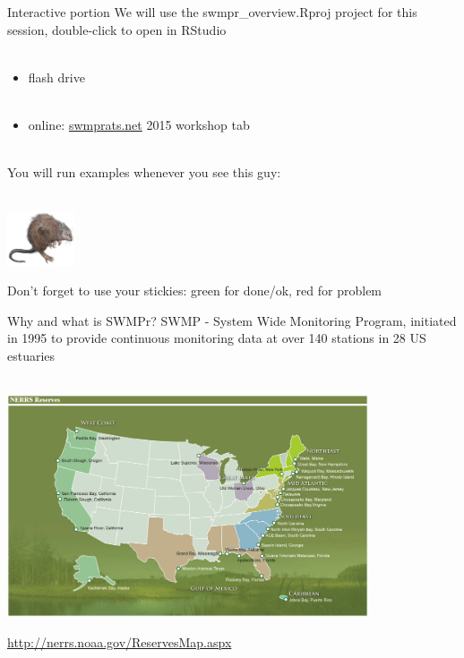 \documentclass[xcolor=dvipsnames,serif]{beamer}\usepackage[]{graphicx}\usepackage[]{color}
\begin{document}
\begin{frame}{Interactive portion}
\onslide<+->
We will use the swmpr\_overview.Rproj project for this session, double-click to open in RStudio \\~\\
\begin{itemize}
\item flash drive\\~\\
\item online: \href{http://swmprats.net/}{swmprats.net} 2015 workshop tab \\~\\
\end{itemize}
\onslide<+->
You will run examples whenever you see this guy: \\~\\
\centerline{\includegraphics[width = 0.15\textwidth]{imgs/swmprat.png}} 
Don't forget to use your stickies: {\color{green} green} for done/ok, {\color{red} red} for problem
\end{frame}

\begin{frame}{Why and what is SWMPr?}
SWMP - System Wide Monitoring Program, initiated in 1995 to provide continuous monitoring data at over 140 stations in 28 US estuaries \\~\\
\centerline{\includegraphics[width = 0.8\textwidth]{imgs/NERRS_locations.png}}
\tiny
\flushright
\href{http://nerrs.noaa.gov/ReservesMap.aspx}{http://nerrs.noaa.gov/ReservesMap.aspx}
\end{frame}
\end{document}
